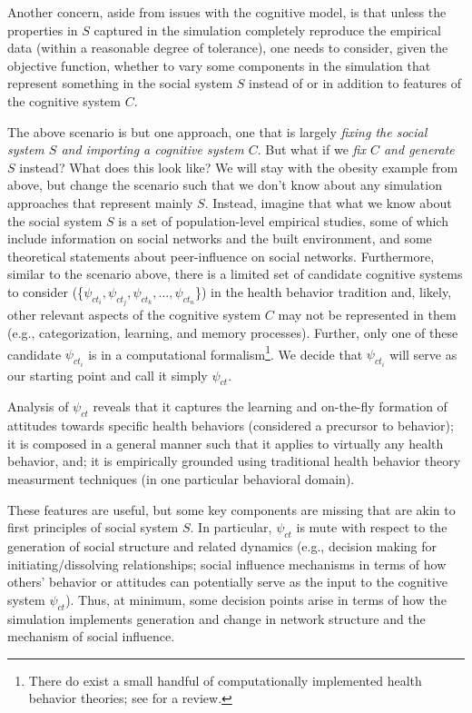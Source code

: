 \documentclass{article}
\begin{document}
Another concern, aside from issues with the cognitive model, is that unless the properties in $S$ captured in the simulation completely reproduce the empirical data (within a reasonable degree of tolerance), one needs to consider, given the objective function, whether to vary some components in the simulation that represent something in the social system $S$ instead of or in addition to features of the cognitive system $C$. 
  
The above scenario is but one approach, one that is largely \textit{fixing the social system $S$ and importing a cognitive system $C$}.  But what if we \textit{fix $C$ and generate $S$} instead?  What does this look like?  We will stay with the obesity example from above, but change the scenario such that we don't know about any simulation approaches that represent mainly $S$.  Instead, imagine that what we know about the social system $S$ is a set of population-level empirical studies, some of which include information on social networks and the built environment, and some theoretical statements about peer-influence on social networks. Furthermore, similar to the scenario above, there is a limited set of candidate cognitive systems to consider (\{$\psi_{ct_i}, \psi_{ct_j}, \psi_{ct_k},...,\psi_{ct_n}$\}) in the health behavior tradition and, likely, other relevant aspects of the cognitive system $C$ may not be represented in them (e.g., categorization, learning, and memory processes).  Further, only one of these candidate $\psi_{ct_i}$ is in a computational formalism\footnote{There do exist a small handful of computationally implemented health behavior theories; see \cite{orr2017readbook} for a review.}.  We decide that $\psi_{ct_i}$ will serve as our starting point and call it simply $\psi_{ct}$.  

Analysis of $\psi_{ct}$ reveals that it captures the learning and on-the-fly formation of attitudes towards specific health behaviors (considered a precursor to behavior); it is composed in a general manner such that it applies to virtually any health behavior, and; it is empirically grounded using traditional health behavior theory measurment techniques (in one particular behavioral domain). 

These features are useful, but some key components are missing that are akin to first principles of social system $S$.  In particular, $\psi_{ct}$ is mute with respect to the generation of social structure and related dynamics (e.g., decision making for initiating/dissolving relationships; social influence mechanisms in terms of how others' behavior or attitudes can potentially serve as the input to the cognitive system $\psi_{ct}$).  Thus, at minimum, some decision points arise in terms of how the simulation implements generation and change in network structure and the mechanism of social influence.  
\end{document}
